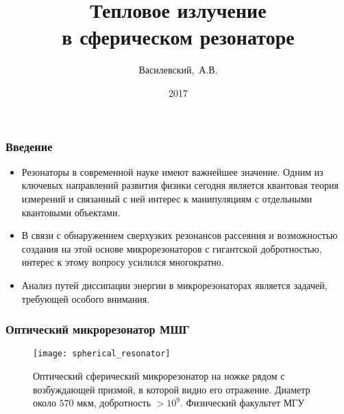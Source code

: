 \documentclass{beamer}
\title{Тепловое излучение\\ в сферическом резонаторе}
\author{Василевский,~А.В.}
\institute[ННГУ]{Нижегородский университет им. Н.И.~Лобачевского}
\date{2017}
\begin{document}

    \frame{\titlepage}


    \begin{frame}\frametitle{Введение}

        \begin{itemize}

            \item Резонаторы в современной науке имеют важнейшее значение. Одним из ключевых направлений развития физики сегодня является квантовая теория измерений и связанный с ней интерес к манипуляциям с отдельными квантовыми объектами.

            \item В связи с обнаружением сверхузких резонансов рассеяния и возможностью создания на этой основе микрорезонаторов с гигантской добротностью, интерес к этому вопросу усилился многократно.

            \item Анализ путей диссипации энергии в микрорезонаторах является задачей, требующей особого внимания.

        \end{itemize}

    \end{frame}


    \begin{frame}\frametitle{Оптический микрорезонатор МШГ}

        \begin{figure}[h]
            \centering
            \texttt{[image: spherical\_resonator]}
            \caption[]{Оптический сферический микрорезонатор на ножке рядом с возбуждающей призмой, в которой видно его отражение. Диаметр около $570$ мкм, добротность $> 10^9$. Физический факультет МГУ \cite{microresonators}}
            \label{fig:spherical_resonator}
        \end{figure}

    \end{frame}
\end{document}
